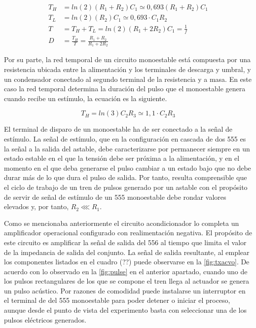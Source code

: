 \begin{align}
	T_H &= ln(2)(R_1 + R_2)C_1 \simeq 0,693(R_1 + R_2)C_1 \\
	T_L &= ln(2)(R_2)C_1 \simeq 0,693\cdot C_1R_2 \\
	T &= T_H + T_L = ln(2)(R_1 + 2R_2)C_1 = \frac{1}{f} \\
	D &= \frac{T_H}{T} = \frac{R_1 + R_2}{R_1 + 2R_2}
	\label{eq:astable}
\end{align}

Por su parte, la red temporal de un circuito monoestable está compuesta por
una resistencia ubicada entre la alimentación y los terminales de descarga
y umbral, y un condensador conectado al segundo terminal de la resistencia
y a masa. En este caso la red temporal determina la duración del pulso que
el monoestable genera cuando recibe un estímulo, la ecuación es la
siguiente.

\begin{equation}
	T_H = ln(3)C_2R_3 \simeq 1,1\cdot C_2R_3
	\label{eq:monostable}
\end{equation}

El terminal de disparo de un monoestable ha de ser conectado a la señal de
estímulo. La señal de estímulo, que en la configuración en cascada de dos
555 es la señal a la salida del astable, debe caracterizarse por permanecer
siempre en un estado estable en el que la tensión debe ser próxima a la
alimentación, y en el momento en el que deba generarse el pulso cambiar a
un estado bajo que no debe durar más de lo que dura el pulso de salida. Por
tanto, resulta comprensible que el ciclo de trabajo de un tren de pulsos
generado por un astable con el propósito de servir de señal de estímulo de
un 555 monoestable debe rondar valores elevados y, por tanto, $R_2 \lll
R_1$.

Como se mencionaba anteriormente el circuito acondicionador lo completa un
amplificador operacional configurado con realimentación negativa. El
propósito de este circuito es amplificar la señal de salida del 556 al
tiempo que limita el valor de la impedancia de salida del conjunto. La
señal de salida resultante, al emplear los componentes listados en el
cuadro (??) puede observarse en la \cref{fig:txacvo}. De acuerdo con lo
observado en la \cref{fig:pulse} en el anterior apartado, cuando uno de los
pulsos rectangulares de los que se compone el tren llega al actuador se
genera un pulso acústico. Por razones de comodidad puede instalarse un
interruptor en el terminal de  del 555 monoestable para poder
detener o iniciar el proceso, aunque desde el punto de vista del
experimento basta con seleccionar una de los pulsos eléctricos generados.

